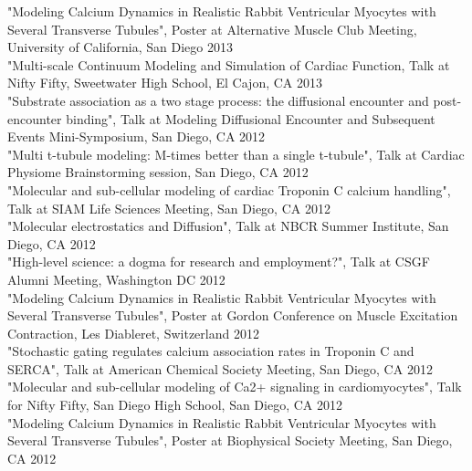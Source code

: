 "Modeling Calcium Dynamics in Realistic Rabbit Ventricular Myocytes with Several Transverse Tubules", Poster at Alternative Muscle Club Meeting, University of California, San Diego  \hfill 2013 \\

"Multi-scale Continuum Modeling and Simulation of Cardiac Function, Talk at Nifty Fifty, Sweetwater High School, El Cajon, CA \hfill 2013 \\

"Substrate association as a two stage process: the diffusional encounter and post-encounter binding", Talk at Modeling Diffusional Encounter and Subsequent Events Mini-Symposium, San Diego, CA  \hfill 2012 \\

"Multi t-tubule modeling: M-times better than a single t-tubule", Talk at Cardiac Physiome Brainstorming session, San Diego, CA  \hfill 2012 \\

"Molecular and sub-cellular modeling of cardiac Troponin C calcium handling", Talk at SIAM Life Sciences Meeting, San Diego, CA  \hfill 2012 \\

"Molecular electrostatics and Diffusion", Talk at NBCR Summer Institute, San Diego, CA \hfill 2012 \\

"High-level science: a dogma for research and employment?", Talk at CSGF Alumni Meeting, Washington DC  \hfill 2012 \\

"Modeling Calcium Dynamics in Realistic Rabbit Ventricular Myocytes with Several Transverse Tubules", Poster at Gordon Conference on Muscle Excitation Contraction, Les Diableret, Switzerland  \hfill 2012 \\

"Stochastic gating regulates calcium association rates in Troponin C and SERCA", Talk at American Chemical Society Meeting, San Diego, CA \hfill 2012 \\

"Molecular and sub-cellular modeling of Ca2+ signaling in cardiomyocytes", Talk for Nifty Fifty, San Diego High School, San Diego, CA  \hfill 2012 \\

"Modeling Calcium Dynamics in Realistic Rabbit Ventricular Myocytes with Several Transverse Tubules", Poster at Biophysical Society Meeting, San Diego, CA  \hfill 2012 \\


